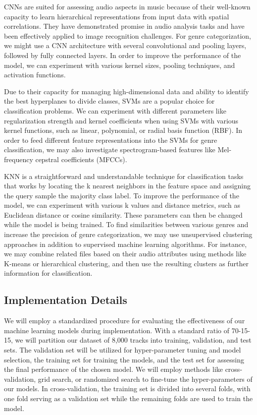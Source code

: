 \documentclass[conference]{IEEEtran}
\begin{document}
CNNs are suited for assessing audio aspects in music because of their well-known capacity to learn hierarchical representations from input data with spatial correlations. They have demonstrated promise in audio analysis tasks and have been effectively applied to image recognition challenges. For genre categorization, we might use a CNN architecture with several convolutional and pooling layers, followed by fully connected layers. In order to improve the performance of the model, we can experiment with various kernel sizes, pooling techniques, and activation functions.

Due to their capacity for managing high-dimensional data and ability to identify the best hyperplanes to divide classes, SVMs are a popular choice for classification problems. We can experiment with different parameters like regularization strength and kernel coefficients when using SVMs with various kernel functions, such as linear, polynomial, or radial basis function (RBF). In order to feed different feature representations into the SVMs for genre classification, we may also investigate spectrogram-based features like Mel-frequency cepstral coefficients (MFCCs).

KNN is a straightforward and understandable technique for classification tasks that works by locating the k nearest neighbors in the feature space and assigning the query sample the majority class label. To improve the performance of the model, we can experiment with various k values and distance metrics, such as Euclidean distance or cosine similarity. These parameters can then be changed while the model is being trained. To find similarities between various genres and increase the precision of genre categorization, we may use unsupervised clustering approaches in addition to supervised machine learning algorithms. For instance, we may combine related files based on their audio attributes using methods like K-means or hierarchical clustering, and then use the resulting clusters as further information for classification.

\subsection{Implementation Details}
We will employ a standardized procedure for evaluating the effectiveness of our machine learning models during implementation. With a standard ratio of 70-15-15, we will partition our dataset of 8,000 tracks into training, validation, and test sets. The validation set will be utilized for hyper-parameter tuning and model selection, the training set for training the models, and the test set for assessing the final performance of the chosen model.
We will employ methods like cross-validation, grid search, or randomized search to fine-tune the hyper-parameters of our models. In cross-validation, the training set is divided into several folds, with one fold serving as a validation set while the remaining folds are used to train the model.
\end{document}
